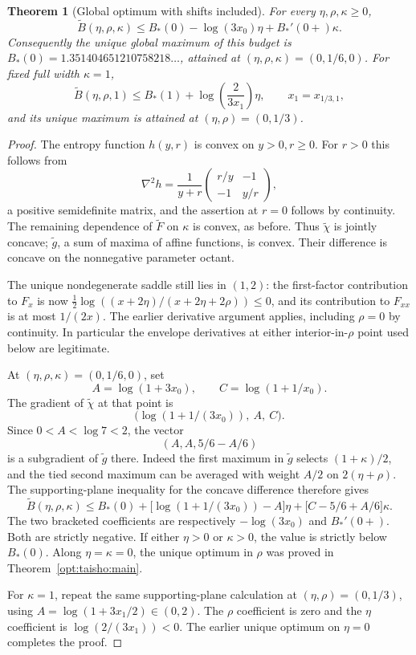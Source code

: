 \documentclass[11pt,a4paper]{article}
\numberwithin{equation}{section}
\newtheorem{theorem}{Theorem}[section]
\theoremstyle{definition}\newtheorem{definition}[theorem]{Definition}
\theoremstyle{remark}\newtheorem{remark}[theorem]{Remark}
\begin{document}
\begin{theorem}[Global optimum with shifts included]
\label{opt:taisho:shiftglobal}
For every $\eta,\rho,\kappa\ge0$,
\[
 \widetilde B(\eta,\rho,\kappa)
 \le B_*(0)-\log(3x_0)\eta+B_*'(0+)\kappa.
\]
Consequently the unique global maximum of this budget is
$B_*(0)=1.351404651210758218\ldots$, attained at
$(\eta,\rho,\kappa)=(0,1/6,0)$.
For fixed full width $\kappa=1$,
\[
 \widetilde B(\eta,\rho,1)
 \le B_*(1)+\log\left(\frac{2}{3x_1}\right)\eta,
 \qquad x_1=x_{1/3,1},
\]
and its unique maximum is attained at $(\eta,\rho)=(0,1/3)$.
\end{theorem}
\begin{proof}
The entropy function $h(y,r)$ is convex on $y>0,r\ge0$.
For $r>0$ this follows from
\[
 \nabla^2h=\frac1{y+r}
 \begin{pmatrix}r/y&-1\\-1&y/r\end{pmatrix},
\]
a positive semidefinite matrix, and the assertion at $r=0$ follows by
continuity. The remaining dependence of $\widetilde F$ on $\kappa$
is convex, as before. Thus $\widetilde\chi$ is jointly concave;
$\widetilde g$, a sum of maxima of affine functions, is convex.
Their difference is concave on the nonnegative parameter octant.

The unique nondegenerate saddle still lies in $(1,2)$: the first-factor
contribution to $F_x$ is now
$\tfrac12\log((x+2\eta)/(x+2\eta+2\rho))\le0$, and its contribution
to $F_{xx}$ is at most $1/(2x)$. The earlier derivative argument applies,
including $\rho=0$ by continuity. In particular the envelope derivatives
at either interior-in-$\rho$ point used below are legitimate.

At $(\eta,\rho,\kappa)=(0,1/6,0)$, set
\[
 A=\log(1+3x_0),\qquad C=\log(1+1/x_0).
\]
The gradient of $\widetilde\chi$ at that point is
\[
 \bigl(\log(1+1/(3x_0)),\ A,\ C\bigr).
\]
Since $0<A<\log7<2$, the vector
\[
                  (A,A,5/6-A/6)
\]
is a subgradient of $\widetilde g$ there. Indeed the first maximum in
$\widetilde g$ selects $(1+\kappa)/2$, and the tied second maximum
can be averaged with weight $A/2$ on $2(\eta+\rho)$.
The supporting-plane inequality for the concave difference therefore
gives
\[
 \widetilde B(\eta,\rho,\kappa)
 \le B_*(0)+\bigl[\log(1+1/(3x_0))-A\bigr]\eta
                 +\bigl[C-5/6+A/6\bigr]\kappa.
\]
The two bracketed coefficients are respectively $-\log(3x_0)$ and
$B_*'(0+)$. Both are strictly negative. If either $\eta>0$ or
$\kappa>0$, the value is strictly below $B_*(0)$. Along
$\eta=\kappa=0$, the unique optimum in $\rho$ was proved in
Theorem~\ref{opt:taisho:main}.

For $\kappa=1$, repeat the same supporting-plane calculation at
$(\eta,\rho)=(0,1/3)$, using
$A=\log(1+3x_1/2)\in(0,2)$. The $\rho$ coefficient is zero and the
$\eta$ coefficient is $\log(2/(3x_1))<0$. The earlier unique optimum
on $\eta=0$ completes the proof.
\end{proof}
\end{document}
